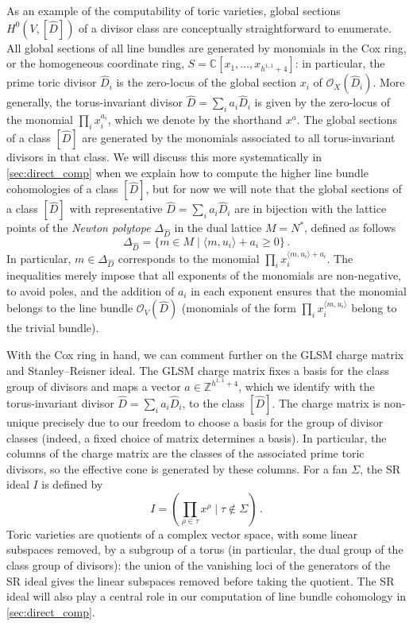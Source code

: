 \documentclass[11pt,dvipsnames]{article}
\theoremstyle{definition}
\begin{document}
As an example of the computability of toric varieties, global sections $H^0(V,[\hat{D}])$ of a divisor class are conceptually straightforward to enumerate. All global sections of all line bundles are generated by monomials in the Cox ring, or the homogeneous coordinate ring, $S = \mathbb{C}[x_1, \dots, x_{h^{1,1}+4}]$: in particular, the prime toric divisor $\hat{D}_i$ is the zero-locus of the global section $x_i$ of $\mathcal{O}_X(\hat{D}_i)$. More generally, the torus-invariant divisor $\hat{D} = \sum_i a_i \hat{D}_i$ is given by the zero-locus of the monomial $\prod_i x_i^{a_i}$, which we denote by the shorthand $x^a$. The global sections of a class $[\hat{D}]$ are generated by the monomials associated to all torus-invariant divisors in that class. We will discuss this more systematically in \cref{sec:direct_comp} when we explain how to compute the higher line bundle cohomologies of a class $[\hat{D}]$, but for now we will note that the global sections of a class $[\hat{D}]$ with representative $\hat{D} = \sum_i a_i \hat{D}_i$ are in bijection with the lattice points of the \textit{Newton polytope} $\Delta_{\hat{D}}$ in the dual lattice $M = N^*$, defined as follows
\begin{equation}
    \label{eq:newton_poly}
    \Delta_{\hat{D}} = \{ m \in M \; | \; \langle m, u_i \rangle + a_i \geq 0 \}\,.
\end{equation}
In particular, $m \in \Delta_{\hat{D}}$ corresponds to the monomial $\prod_i x_i^{\langle m, u_i \rangle + a_i}$. The inequalities merely impose that all exponents of the monomials are non-negative, to avoid poles, and the addition of $a_i$ in each exponent ensures that the monomial belongs to the line bundle $\mathcal{O}_V(\hat{D})$ (monomials of the form $\prod_i x_i^{\langle m, u_i \rangle}$ belong to the trivial bundle).

With the Cox ring in hand, we can comment further on the GLSM charge matrix and Stanley--Reisner ideal. The GLSM charge matrix fixes a basis for the class group of divisors and maps a vector $a \in \mathbb{Z}^{h^{1,1} + 4}$, which we identify with the torus-invariant divisor $\hat{D} = \sum_i a_i \hat{D}_i$, to the class $[\hat{D}]$. The charge matrix is non-unique precisely due to our freedom to choose a basis for the group of divisor classes (indeed, a fixed choice of matrix determines a basis). In particular, the columns of the charge matrix are the classes of the associated prime toric divisors, so the effective cone is generated by these columns. For a fan $\Sigma$, the SR ideal $I$ is defined by
\begin{equation}
    I = \left( \prod_{\rho \in \tau} x^\rho \; \Big| \; \tau \notin \Sigma \right)\,.
\end{equation}
Toric varieties are quotients of a complex vector space, with some linear subspaces removed, by a subgroup of a torus (in particular, the dual group of the class group of divisors): the union of the vanishing loci of the generators of the SR ideal gives the linear subspaces removed before taking the quotient. The SR ideal will also play a central role in our computation of line bundle cohomology in \cref{sec:direct_comp}.
\end{document}
